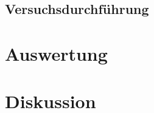 \subsection{Versuchsdurchführung}

\section{Auswertung}

\section{Diskussion}
\newpage
\nocite{*}
\printbibliography
